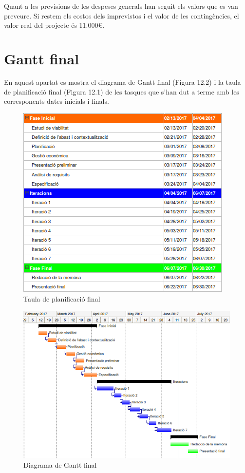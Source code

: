 Quant a les previsions de les despeses generals han seguit els valors que es
van preveure. Si restem els costos dels imprevistos i el valor de les contingències, el valor real del projecte és 11.000\euro.

\section{Gantt final}

En aquest apartat es mostra el diagrama de Gantt final (Figura 12.2) i la taula de planificació final (Figura 12.1) de les tasques que s'han dut a terme amb les corresponents dates inicials i finals.

\begin{figure}[!h]
\centering
\includegraphics[scale=1]{Figures/ganttFinal.png}
\caption{Taula de planificació final}
\end{figure}

\begin{figure}[!h]
\centering
\includegraphics[scale=0.85]{Figures/ganttFinal2.png}
\caption{Diagrama de Gantt final}
\end{figure}

